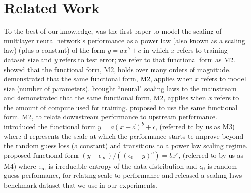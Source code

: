\documentclass{article} %
\newcommand{\ir}[1]		{{ \textcolor{blue} { #1}}}
\begin{document}
\section{Related Work}
\vspace{-3.1mm}
To the best of our knowledge, \citet{cortes1994learning} was the first paper to model the scaling of multilayer neural network's performance as a power law (also known as a scaling law) (plus a constant)
of the form $y=ax^b + c$ in which $x$ refers to training dataset size and $y$ refers to test error; we refer to that functional form as M2. \citet{2017arXiv171200409H} showed that the functional form, M2, holds over many orders of magnitude. \citet{DBLP:journals/corr/abs-1909-12673} demonstrated  that the same functional form, M2, applies when $x$ refers to model size (number of parameters). \citet{icm2020arXiv200108361K} brought ``neural" scaling laws to the mainstream and demonstrated that the same functional form, M2, applies when $x$ refers to the amount of compute used for training. \citet{abnar2021exploring} proposed to use the same functional form, M2, to relate downstream performance to upstream performance. \citet{DBLP:journals/corr/abs-2106-04560} introduced the functional form $y=a(x+d)^b + c$, (referred to by us as M3) where  d represents the scale at which the performance starts to improve beyond the  random guess loss (a constant) and transitions to a  power law scaling regime. \citet{Alabdulmohsi2022revisiting} proposed functional form $(y - \epsilon_{\infty}) / ((\epsilon_{0} - y)^a) = bx^c$, (referred to by us as M4) where  $\epsilon_{\infty}$ is irreducible entropy of the data distribution and $\epsilon_{0}$ is random guess performance, for relating scale to performance and released a scaling laws benchmark dataset that we use in our experiments. %

\vspace{-1.2mm}

\end{document}
